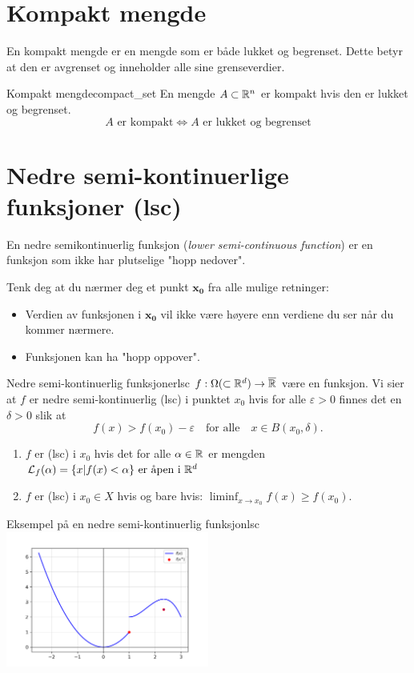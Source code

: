 \section{Kompakt mengde}
En kompakt mengde er en mengde som er både lukket og begrenset. Dette betyr at den er avgrenset og inneholder alle sine grenseverdier.

\begin{definition}{Kompakt mengde}{compact_set}
  En mengde \(A \subset \mathbb{R}^n\) er kompakt hvis den er lukket og begrenset.
  \[
    A \text{ er kompakt} \Leftrightarrow A \text{ er lukket og begrenset}
  \]
\end{definition}

\section{Nedre semi-kontinuerlige funksjoner (lsc)}

En nedre semikontinuerlig funksjon (\textit{lower semi-continuous function}) er en funksjon som ikke har plutselige "hopp nedover".

Tenk deg at du nærmer deg et punkt \( \symbf{x_0} \) fra alle mulige retninger:
\begin{itemize}
  \item Verdien av funksjonen i \( \symbf{x_0} \) vil ikke være høyere enn verdiene du ser når du kommer nærmere.
  \item Funksjonen kan ha "hopp oppover".
\end{itemize}


\begin{definition}{Nedre semi-kontinuerlig funksjoner}{lsc}
  \(f: \Omega (\subset \mathbb{R}^d) \to \overline{\mathbb{R}}\) være en funksjon. Vi sier at \(f\) er nedre semi-kontinuerlig (lsc) i punktet \(x_0\) hvis for alle \(\varepsilon > 0\) finnes det en \(\delta > 0\) slik at
  \[
    f(x) > f(x_0) - \varepsilon \quad \text{for alle} \quad x \in B(x_0, \delta).
  \]
  \begin{enumerate}
    \item \(f\) er (lsc) i \(x_0\) hvis det for alle \(\alpha \in \mathbb{R}\) er mengden \(\mathcal{L}_f(\alpha) = \{x | f(x) < \alpha \} \text{ er åpen i } \mathbb{R}^d\)
    \item \(f\) er (lsc) i \(x_0 \in X\) hvis og bare hvis: \(\liminf_{x \to x_0} f(x) \geq f(x_0)\).
  \end{enumerate}
\end{definition}
\begin{example}{Eksempel på en nedre semi-kontinuerlig funksjon}{lsc}
  \includegraphics[width=0.5\textwidth]{figures/example_lsc.png}
\end{example}

